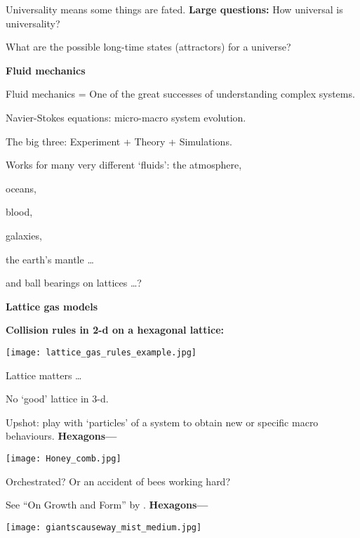       Universality means some things are fated.
  \textbf{Large questions:}
      How universal is universality?
    
      What are the possible long-time states (attractors) for a universe?
    
  \textbf{Fluid mechanics}
  
   
    Fluid mechanics = One of the great successes of 
    understanding complex systems.
   
    Navier-Stokes equations: micro-macro system evolution.
   
    The big three: Experiment + Theory + Simulations.
   
    Works for many very different `fluids':
      the atmosphere,
     
      oceans,
     
      blood,
     
      galaxies,
     
      the earth's mantle \ldots
    
      \alert{and ball bearings on lattices \ldots ?}
  
  \textbf{Lattice gas models}

  \textbf{Collision rules in 2-d on a hexagonal lattice:}
  \begin{center}
    \texttt{[image: lattice\_gas\_rules\_example.jpg]}
  \end{center}
  
    Lattice matters \ldots
   
    No `good' lattice in 3-d.
  
    Upshot: play with `particles' of a system to obtain new or specific macro behaviours.
  \textbf{Hexagons---}

  \begin{center}
    \texttt{[image: Honey\_comb.jpg]}
  \end{center}
  
    Orchestrated?  Or an accident of bees working hard?
   
    See ``On Growth and Form'' by 
    .\cite{thompson1952a,thompson1961a}
  \textbf{Hexagons---}

  \texttt{[image: giantscauseway\_mist\_medium.jpg]}


